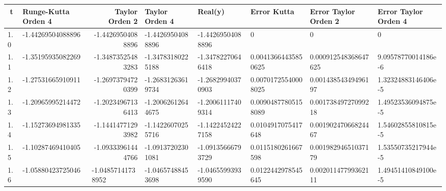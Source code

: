 \documentclass[12pt,b4paper,landscape]{memoir}
\begin{document}
\begin{table}[]

\begin{tabular}{|l|l|r|l|l|l|l|l|}
\hline

\multicolumn{1}{|c|}{\textbf{t}} & \textbf{Runge-Kutta Orden 4} & \textbf{Taylor Orden 2}                 & \textbf{Taylor Orden 4} & \textbf{Real(y)}   & \textbf{Error Kutta} & \textbf{Error Taylor Orden 2} & \textbf{Error Taylor Orden 4} \\ \hline
1.0                                                      & -1.44269504088896            & -1.44269504088896                       & -1.44269504088896       & -1.44269504088896  & 0                    & 0                             & 0                             \\ \hline
1.1                                                      & -1.35195935082269            & -1.34873525483283                       & -1.34783180225188       & -1.34782270646418  & 0.00413664435850625  & 0.000912548368647625          & 9.09578770014186e-6           \\ \hline
1.2                                                      & -1.27531665910911            & -1.26973794720399                       & -1.26831263619734       & -1.26829940370903  & 0.00701725540008025  & 0.00143854349496197           & 1.32324883146406e-5           \\ \hline
1.3                                                      & -1.20965995214472            & -1.20234967136413                       & -1.20062612644675       & -1.20061117409314  & 0.00904877805158089  & 0.00173849727099218           & 1.49523536094875e-5           \\ \hline
1.4                                                      & -1.15273694981335            & -1.14414771293982                       & -1.14226070255716       & -1.14224524227158  & 0.0104917075417648   & 0.00190247066824467           & 1.54602855810815e-5           \\ \hline
1.5                                                      & -1.10287469410405            & -1.09333961444766                       & -1.09137202301081       & -1.09135666793729  & 0.0115180261667598   & 0.00198294651037179           & 1.53550735217944e-5           \\ \hline
1.6                                                      & -1.05880423725046            & \multicolumn{1}{l|}{-1.04857141738952}  & -1.04657488453698       & -1.04655993939590  & 0.0122442978545645   & 0.00201147799362111           & 1.49451410849100e-5           \\ \hline

\end{tabular}
\end{table}
\end{document}
